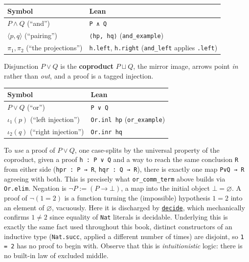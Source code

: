 \begin{longtable}[]{@{}
  >{\raggedright\arraybackslash}p{}
  >{\raggedright\arraybackslash}p{}@{}}
\toprule\noalign{}
\begin{minipage}[b]{\linewidth}\raggedright
Symbol
\end{minipage} & \begin{minipage}[b]{\linewidth}\raggedright
Lean
\end{minipage} \\
\midrule\noalign{}
\endhead
\bottomrule\noalign{}
\endlastfoot
\(P \wedge Q\) (``and'') & \texttt{P ∧ Q} \\
\(\langle p, q \rangle\) (``pairing'') & \texttt{⟨hp, hq⟩} (\texttt{and\_\allowbreak{}example}) \\
\(\pi_1, \pi_2\) (``the projections'') & \texttt{h.left}, \texttt{h.right} (\texttt{and\_\allowbreak{}left} applies \texttt{.left}) \\
\end{longtable}

Disjunction \(P \vee Q\) is the \textbf{coproduct} \(P \sqcup Q\), the mirror image, arrows point \emph{in} rather than \emph{out}, and a proof is a tagged injection.

\begin{center}

\end{center}

\begin{longtable}[]{@{}ll@{}}
\toprule\noalign{}
Symbol & Lean \\
\midrule\noalign{}
\endhead
\bottomrule\noalign{}
\endlastfoot
\(P \vee Q\) (``or'') & \texttt{P ∨ Q} \\
\(\iota_1(p)\) (``left injection'') & \texttt{Or.inl hp} (\texttt{or\_\allowbreak{}example}) \\
\(\iota_2(q)\) (``right injection'') & \texttt{Or.inr hq} \\
\end{longtable}

To \emph{use} a proof of \(P \vee Q\), one case-splits by the universal property of the coproduct, given a proof \texttt{h : P ∨ Q} and a way to reach the same conclusion \texttt{R} from either side (\texttt{hpr : P → R}, \texttt{hqr : Q → R}), there is exactly one map \texttt{P∨Q → R} agreeing with both. This is precisely what \texttt{or\_\allowbreak{}comm\_\allowbreak{}term} above builds via \texttt{Or.elim}. Negation is \(\neg P := (P \to
\bot)\), a map into the initial object \(\bot = \varnothing\). A proof of \(\neg(1=2)\) is a function turning the (impossible) hypothesis \(1 = 2\) into an element of \(\varnothing\), vacuously. Here it is discharged by \href{https://lean-lang.org/doc/reference/latest/Tactic-Proofs/Tactic-Reference/}{\texttt{decide}}, which mechanically confirms \(1 \neq 2\) since equality of \texttt{Nat} literals is decidable. Underlying this is exactly the same fact used throughout this book, distinct constructors of an inductive type (\texttt{Nat.succ}, applied a different number of times) are disjoint, so \texttt{1 = 2} has no proof to begin with. Observe that this is \emph{intuitionistic} logic: there is no built-in law of excluded middle.

